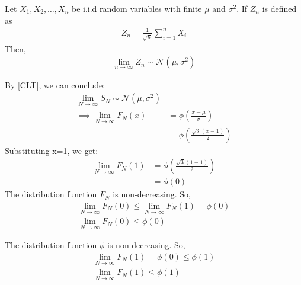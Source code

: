 \documentclass[journal,12pt,twocolumn]{IEEEtran}
\begin{document}
\begin{theorem}
Let $X_1,X_2,\dots,X_n$ be i.i.d random variables with finite $\mu$ and $\sigma^2$. If $Z_n$ is defined as
\begin{align}
  Z_n = \frac{1}{\sqrt{n}} \sum_{i=1}^n X_i
 \end{align}
Then,
\begin{align}
   \lim_{n \to \infty} Z_n \sim \mathcal N(\mu,\sigma^2) \label{CLT}
\end{align}

\end{theorem}
By \eqref{CLT}, we can conclude:
\begin{align}
\lim_{N\to\infty} S_N \sim \mathcal N(\mu,\sigma^2)\\
\implies \lim_{N\to\infty} F_N(x) &= \phi\left(\frac{x-\mu}{\sigma}\right)\\
&= \phi\left(\frac{\sqrt{3}(x-1)}{2}\right)
\end{align}
Substituting x=1, we get:
\begin{align}
    \lim_{N\to\infty} F_N(1) &=  \phi\left(\frac{\sqrt{3}(1-1)}{2}\right)\\
    &= \phi(0)
\end{align}
The distribution function $F_N$ is non-decreasing. So,
\begin{align}
    \lim_{N\to\infty} F_N(0) \leq \lim_{N\to\infty} F_N(1) = \phi(0)\\
    \lim_{N\to\infty} F_N(0) \leq \phi(0)
\end{align}

The distribution function $\phi$ is non-decreasing. So,
\begin{align}
    \lim_{N\to\infty} F_N(1) = \phi(0) \leq \phi(1)\\
    \lim_{N\to\infty} F_N(1) \leq \phi(1)
\end{align}
\bigskip
{}
\end{document}
